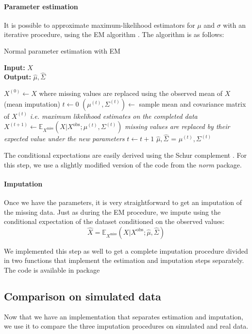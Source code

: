 \paragraph{Parameter estimation}
It is possible to approximate maximum-likelihood estimators for $\mu$ and $\sigma$ with an iterative procedure, using the EM algorithm \cite{EM} \cite{em_normal_fit}. The algorithm is as follows:
\begin{algorithm}[H]
	\caption{Normal parameter estimation with EM}
	\hspace*{\algorithmicindent} \textbf{Input:} $X$  \\
 	\hspace*{\algorithmicindent} \textbf{Output:} $\hat{\mu}, \hat{\Sigma}$
	\begin{algorithmic}[1]
		\State $X^{(0)} \leftarrow X$ where missing values are replaced using the observed mean of $X$ (mean imputation)
		\State $t \leftarrow 0$
			\State $(\mu^{(t)}, \Sigma^{(t)}) \leftarrow$  sample mean and covariance matrix of $X^{(t)}$ \Comment \emph{i.e. maximum likelihood estimates on the completed data}
			\State $X^{(t+1)} \leftarrow  \mathbb{E}_{X^{\text{miss}}}(X \vert X^{\text{obs}} ; \mu^{(t)}, \Sigma^{(t)})$ \Comment \emph{missing values are replaced by their expected value under the new parameters}
			\State $t \leftarrow t+1$
		\EndWhile
		\State $\hat{\mu}, \hat{\Sigma}$ = $\mu^{(t)}, \Sigma^{(t)}$
	\end{algorithmic}
\end{algorithm}

The conditional expectations are easily derived using the Schur complement \cite{norm_schur}. For this step, we use a slightly modified version of the code from the \emph{norm} package.

\paragraph{Imputation}
Once we have the parameters, it is very straightforward to get an imputation of the missing data. Just as during the EM procedure, we impute using the conditional expectation of the dataset conditioned on the observed values: 
$$\hat{X} = \mathbb{E}_{X^{\text{miss}}}(X \vert X^{\text{obs}} ; \hat{\mu}, \hat{\Sigma})$$

We implemented this step as well to get a complete imputation procedure divided in two functions that implement the estimation and imputation steps separately. The code is available in package 

		\subsection{Comparison on simulated data}
Now that we have an implementation that separates estimation and imputation, we use it to compare the three imputation procedures on simulated and real data. 
